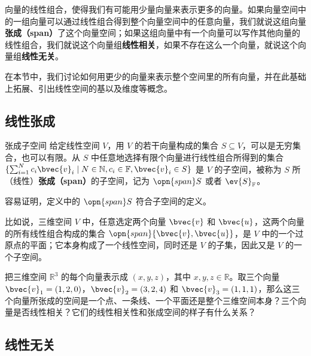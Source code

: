 
\begin{issues}
\issueTODO
\end{issues}


向量的线性组合，使得我们有可能用少量向量来表示更多的向量。如果向量空间中的一组向量可以通过线性组合得到整个向量空间中的任意向量，我们就说这组向量\textbf{张成（span）}了这个向量空间；如果这组向量中有一个向量可以写作其他向量的线性组合，我们就说这个向量组\textbf{线性相关}，如果不存在这么一个向量，就说这个向量组\textbf{线性无关}。

在本节中，我们讨论如何用更少的向量来表示整个空间里的所有向量，并在此基础上拓展、引出线性空间的基以及维度等概念。

\subsection{线性张成}

\begin{definition}{张成子空间}\label{def_VecSpn_1}
给定线性空间 $V$，用 $V$ 的若干向量构成的集合 $S \subseteq V$，可以是无穷集合，也可以有限。从 $S$ 中任意地选择有限个向量进行线性组合所得到的集合 $\{\sum_{i = 1}^N c_i\bvec{v}_i \mid N \in\mathbb{N}, c_i\in\mathbb{F}, \bvec{v}_i \in S\}$ 是 $V$ 的子空间，被称为 $S$ 所（线性）\textbf{张成（span）}的子空间，记为 $\opn{span} S$ 或者 $\ev{S}_\mathbb{F}$。
\end{definition}
容易证明，定义中的 $\opn{span} S$ 符合子空间的定义。

比如说，三维空间 $V$ 中，任意选定两个向量 $\bvec{v}$ 和 $\bvec{u}$，这两个向量的所有线性组合构成的集合 $\opn{span}\{\bvec{v}, \bvec{u}\}$，是 $V$ 中的一个过原点的平面；它本身构成了一个线性空间，同时还是 $V$ 的子集，因此又是 $V$ 的一个子空间。

\begin{exercise}{}\label{exe_VecSpn_1}
把三维空间 $\mathbb{R}^3$ 的每个向量表示成 $(x,y,z)$，其中 $x,y,z\in\mathbb{R}$。取三个向量 $\bvec{v}_1=(1,2,0)$，$\bvec{v}_2=(3,2,4)$ 和 $\bvec{v}_3=(1,1,1)$，那么这三个向量所张成的空间是一个点、一条线、一个平面还是整个三维空间本身？三个向量是否线性相关？它们的线性相关性和张成空间的样子有什么关系？
\end{exercise}


\subsection{线性无关}

